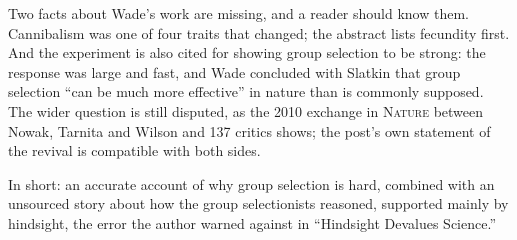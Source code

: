 \begin{afterword}
Two facts about Wade's work are missing, and a reader should know them. Cannibalism was one of four traits that changed; the abstract lists fecundity first. And the experiment is also cited for showing group selection to be strong: the response was large and fast, and Wade concluded with Slatkin that group selection ``can be much more effective'' in nature than is commonly supposed. The wider question is still disputed, as the 2010 exchange in \textsc{Nature} between Nowak, Tarnita and Wilson and 137 critics shows; the post's own statement of the revival is compatible with both sides.

In short: an accurate account of why group selection is hard, combined with an unsourced story about how the group selectionists reasoned, supported mainly by hindsight, the error the author warned against in ``Hindsight Devalues Science.''
\end{afterword}
